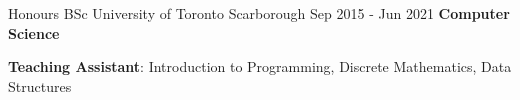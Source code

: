 
\begin{cventries}
  \cventry
    {Honours BSc}
    {University of Toronto}
    {Scarborough}
    {Sep 2015 - Jun 2021}
    {\textbf{Computer Science}}
    {
      \begin{cvitems}
        \item {\textbf{Teaching Assistant}: Introduction to Programming, Discrete Mathematics, Data Structures}
      \end{cvitems}
    }
\end{cventries}
